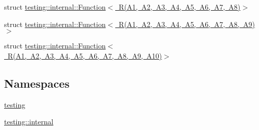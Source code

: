 \begin{DoxyCompactItemize}
struct \mbox{\hyperlink{structtesting_1_1internal_1_1Function_3_01R_07A1_00_01A2_00_01A3_00_01A4_00_01A5_00_01A6_00_01A7_00_01A8_08_4}{testing\+::internal\+::\+Function$<$ R(\+A1, A2, A3, A4, A5, A6, A7, A8)$>$}}
\item 
struct \mbox{\hyperlink{structtesting_1_1internal_1_1Function_3_01R_07A1_00_01A2_00_01A3_00_01A4_00_01A5_00_01A6_00_01A7_00_01A8_00_01A9_08_4}{testing\+::internal\+::\+Function$<$ R(\+A1, A2, A3, A4, A5, A6, A7, A8, A9)$>$}}
\item 
struct \mbox{\hyperlink{structtesting_1_1internal_1_1Function_3_01R_07A1_00_01A2_00_01A3_00_01A4_00_01A5_00_01A6_00_01A7_00_01A8_00_01A9_00_01A10_08_4}{testing\+::internal\+::\+Function$<$ R(\+A1, A2, A3, A4, A5, A6, A7, A8, A9, A10)$>$}}
\end{DoxyCompactItemize}
\subsection*{Namespaces}
\begin{DoxyCompactItemize}
\item 
 \mbox{\hyperlink{namespacetesting}{testing}}
\item 
 \mbox{\hyperlink{namespacetesting_1_1internal}{testing\+::internal}}
\end{DoxyCompactItemize}
